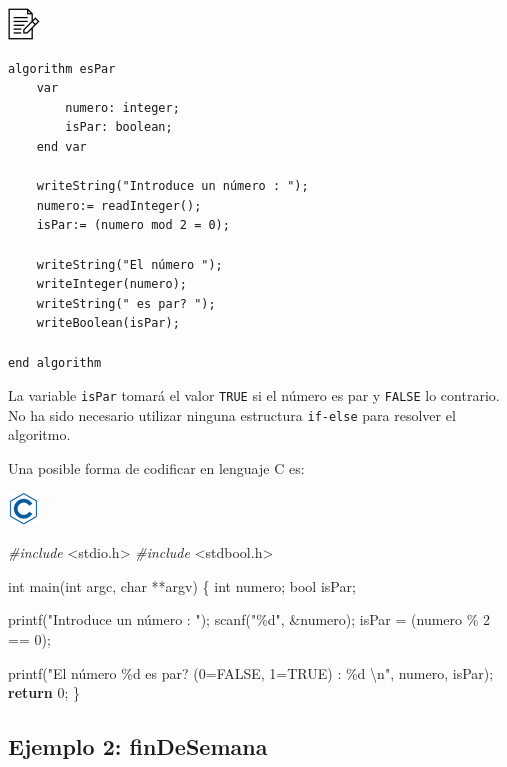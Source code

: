 \documentclass[
]{book}
\newenvironment{Shaded}{\begin{snugshade}}{\end{snugshade}}
\newcommand{\ControlFlowTok}[1]{\textcolor[rgb]{0.13,0.29,0.53}{\textbf{#1}}}
\newcommand{\DataTypeTok}[1]{\textcolor[rgb]{0.13,0.29,0.53}{#1}}
\newcommand{\DecValTok}[1]{\textcolor[rgb]{0.00,0.00,0.81}{#1}}
\newcommand{\ImportTok}[1]{#1}
\newcommand{\NormalTok}[1]{#1}
\newcommand{\PreprocessorTok}[1]{\textcolor[rgb]{0.56,0.35,0.01}{\textit{#1}}}
\newcommand{\SpecialCharTok}[1]{\textcolor[rgb]{0.00,0.00,0.00}{#1}}
\newcommand{\StringTok}[1]{\textcolor[rgb]{0.31,0.60,0.02}{#1}}
\begin{document}
\includegraphics{./img/alg.png}

\begin{verbatim}
algorithm esPar
    var
        numero: integer;
        isPar: boolean;
    end var

    writeString("Introduce un número : ");
    numero:= readInteger();
    isPar:= (numero mod 2 = 0);
    
    writeString("El número ");
    writeInteger(numero);
    writeString(" es par? ");
    writeBoolean(isPar);

end algorithm
\end{verbatim}

La variable \texttt{isPar} tomará el valor \texttt{TRUE} si el número es par y \texttt{FALSE} lo contrario. No ha sido necesario utilizar ninguna estructura \texttt{if-else} para resolver el algoritmo.

Una posible forma de codificar en lenguaje C es:

\includegraphics{./img/c.png}

\begin{Shaded}
\begin{Highlighting}[]
\PreprocessorTok{\#include }\ImportTok{\textless{}stdio.h\textgreater{}}
\PreprocessorTok{\#include }\ImportTok{\textless{}stdbool.h\textgreater{}}

\DataTypeTok{int}\NormalTok{ main(}\DataTypeTok{int}\NormalTok{ argc, }\DataTypeTok{char}\NormalTok{ **argv) \{}
    \DataTypeTok{int}\NormalTok{ numero;}
    \DataTypeTok{bool}\NormalTok{ isPar;}

\NormalTok{    printf(}\StringTok{"Introduce un número : "}\NormalTok{);}
\NormalTok{    scanf(}\StringTok{"\%d"}\NormalTok{, \&numero);}
\NormalTok{    isPar = (numero \% }\DecValTok{2}\NormalTok{ == }\DecValTok{0}\NormalTok{);}
    
\NormalTok{    printf(}\StringTok{"El número \%d es par? (0=FALSE, 1=TRUE) : \%d }\SpecialCharTok{\textbackslash{}n}\StringTok{"}\NormalTok{, numero, isPar);}
    \ControlFlowTok{return} \DecValTok{0}\NormalTok{;}
\NormalTok{\}}
\end{Highlighting}
\end{Shaded}

\hypertarget{ejemplo-2-findesemana}{%
\subsection{Ejemplo 2: finDeSemana}\label{ejemplo-2-findesemana}}
\end{document}
